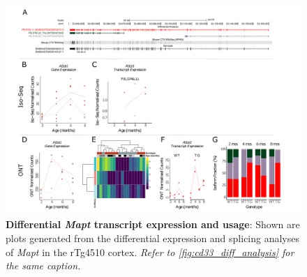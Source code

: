 \begin{landscape}
	\begin{figure}[htp]
		\begin{center}
			\includegraphics[page=11,trim={0 0.5cm 0 1.5cm},scale =0.85]{Figures/TargetGene_DifferentialAnalysis.pdf}
		\end{center}
		\captionsetup{width=1.5\textwidth}
		\caption[Differential \textit{Mapt} transcript expression and usage]%
		{\textbf{Differential \textit{Mapt} transcript expression and usage}: Shown are plots generated from the differential expression and splicing analyses of \textit{Mapt} in the rTg4510 cortex. \textit{Refer to \cref{fig:cd33_diff_analysis} for the same caption.}}   
		\label{fig:Mapt_diff_analysis}
	\end{figure}
\end{landscape}

